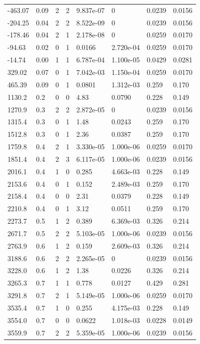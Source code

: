 \documentclass[preview]{standalone}
\begin{document}
{{\begin{tabular}{L{1.2cm}C{1.2cm} C{0.3cm}C{0.5cm} C{1.4cm}C{1.4cm} C{1.4cm}C{1.4cm}}
  -463.07  &  0.09  & 2     &  2 &  9.837e-07  & 0  & 0.0239 &  0.0156   \\ 
  -204.25  &  0.04  & 2     &  2 &  8.522e-09  & 0  & 0.0239 &  0.0156   \\ 
  -178.46  &  0.04  & 2     &  1 &  2.178e-08  & 0  & 0.0259 &  0.0170   \\ 
  -94.63  &  0.02  & 0     &  1 &  0.0166  & 2.720e-04  & 0.0259 &  0.0170   \\ 
  -14.74  &  0.00  & 1     &  1 &  6.787e-04  & 1.100e-05  & 0.0429 &  0.0281   \\ 
  329.02  &  0.07  & 0     &  1 &  7.042e-03  & 1.150e-04  & 0.0259 &  0.0170   \\ 
  465.39  &  0.09  & 0     &  1 &  0.0801  & 1.312e-03  & 0.259 &  0.170   \\ 
  1130.2  &   0.2  & 0     &  0 &  4.83  & 0.0790  & 0.228 &  0.149   \\ 
  1270.9  &   0.3  & 2     &  2 &  2.872e-05  & 0  & 0.0239 &  0.0156   \\ 
  1315.4  &   0.3  & 0     &  1 &  1.48  & 0.0243  & 0.259 &  0.170   \\ 
  1512.8  &   0.3  & 0     &  1 &  2.36  & 0.0387  & 0.259 &  0.170   \\ 
  1759.8  &   0.4  & 2     &  1 &  3.330e-05  & 1.000e-06  & 0.0259 &  0.0170   \\ 
  1851.4  &   0.4  & 2     &  3 &  6.117e-05  & 1.000e-06  & 0.0239 &  0.0156   \\ 
  2016.1  &   0.4  & 1     &  0 &  0.285  & 4.663e-03  & 0.228 &  0.149   \\ 
  2153.6  &   0.4  & 0     &  1 &  0.152  & 2.489e-03  & 0.259 &  0.170   \\ 
  2158.4  &   0.4  & 0     &  0 &  2.31  & 0.0379  & 0.228 &  0.149   \\ 
  2210.8  &   0.4  & 0     &  1 &  3.12  & 0.0511  & 0.259 &  0.170   \\ 
  2273.7  &   0.5  & 1     &  2 &  0.389  & 6.369e-03  & 0.326 &  0.214   \\ 
  2671.7  &   0.5  & 2     &  2 &  5.103e-05  & 1.000e-06  & 0.0239 &  0.0156   \\ 
  2763.9  &   0.6  & 1     &  2 &  0.159  & 2.609e-03  & 0.326 &  0.214   \\ 
  3188.6  &   0.6  & 2     &  2 &  2.265e-05  & 0  & 0.0239 &  0.0156   \\ 
  3228.0  &   0.6  & 1     &  2 &  1.38  & 0.0226  & 0.326 &  0.214   \\ 
  3265.3  &   0.7  & 1     &  1 &  0.778  & 0.0127  & 0.429 &  0.281   \\ 
  3291.8  &   0.7  & 2     &  1 &  5.149e-05  & 1.000e-06  & 0.0259 &  0.0170   \\ 
  3535.4  &   0.7  & 1     &  0 &  0.255  & 4.175e-03  & 0.228 &  0.149   \\ 
  3554.0  &   0.7  & 0     &  0 &  0.0622  & 1.018e-03  & 0.0228 &  0.0149   \\ 
  3559.9  &   0.7  & 2     &  2 &  5.359e-05  & 1.000e-06  & 0.0239 &  0.0156   \\ 
\hline 
\end{tabular} 

}}
\end{document}
